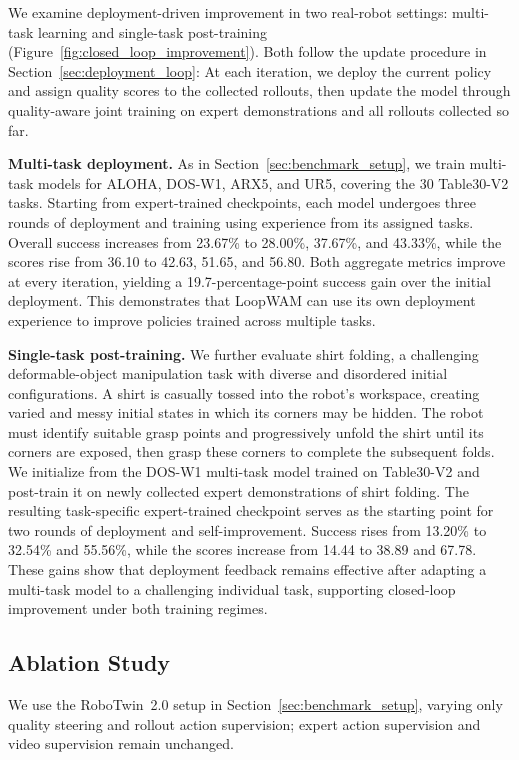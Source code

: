 We examine deployment-driven improvement in two real-robot settings: multi-task learning and single-task post-training (Figure~\ref{fig:closed_loop_improvement}).
Both follow the update procedure in Section~\ref{sec:deployment_loop}: At each iteration, we deploy the current policy and assign quality scores to the collected rollouts, then update the model through quality-aware joint training on expert demonstrations and all rollouts collected so far.

\textbf{Multi-task deployment.}
As in Section~\ref{sec:benchmark_setup}, we train multi-task models for ALOHA, DOS-W1, ARX5, and UR5, covering the 30 Table30-V2 tasks.
Starting from expert-trained checkpoints, each model undergoes three rounds of deployment and training using experience from its assigned tasks.
Overall success increases from 23.67\% to 28.00\%, 37.67\%, and 43.33\%, while the scores rise from 36.10 to 42.63, 51.65, and 56.80.
Both aggregate metrics improve at every iteration, yielding a 19.7-percentage-point success gain over the initial deployment.
This demonstrates that LoopWAM can use its own deployment experience to improve policies trained across multiple tasks.

\textbf{Single-task post-training.}
We further evaluate shirt folding, a challenging deformable-object manipulation task with diverse and disordered initial configurations.
A shirt is casually tossed into the robot's workspace, creating varied and messy initial states in which its corners may be hidden.
The robot must identify suitable grasp points and progressively unfold the shirt until its corners are exposed, then grasp these corners to complete the subsequent folds.
We initialize from the DOS-W1 multi-task model trained on Table30-V2 and post-train it on newly collected expert demonstrations of shirt folding.
The resulting task-specific expert-trained checkpoint serves as the starting point for two rounds of deployment and self-improvement.
Success rises from 13.20\% to 32.54\% and 55.56\%, while the scores increase from 14.44 to 38.89 and 67.78.
These gains show that deployment feedback remains effective after adapting a multi-task model to a challenging individual task, supporting closed-loop improvement under both training regimes.

\subsection{Ablation Study}
\label{sec:ablation}

We use the RoboTwin~2.0 setup in Section~\ref{sec:benchmark_setup}, varying only quality steering and rollout action supervision; expert action supervision and video supervision remain unchanged.

